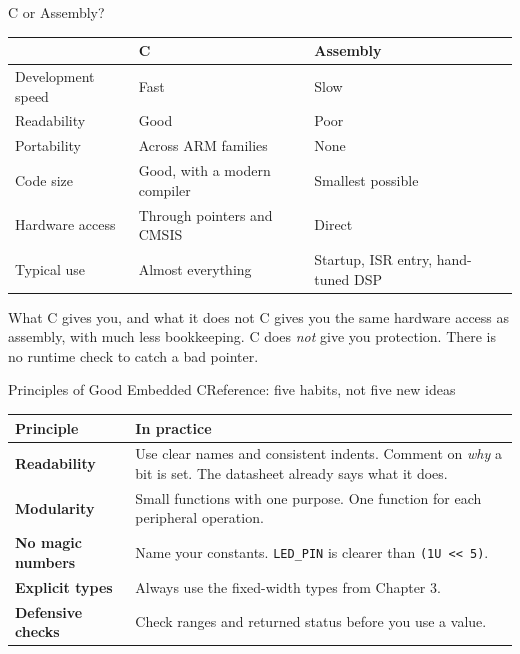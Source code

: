 \documentclass[9pt,aspectratio=169,xcolor=table]{beamer}
\newcommand{\shl}{\texttt{<{}<}}
\begin{document}
\begin{frame}{C or Assembly?}
    \begin{center}
    {\small
    \striped
    \begin{tabular}{@{}l l l@{}}
        \toprule
         & \textbf{C} & \textbf{Assembly} \\
        \midrule
        Development speed & Fast & Slow \\
        Readability & Good & Poor \\
        Portability & Across ARM families & None \\
        Code size & Good, with a modern compiler & Smallest possible \\
        Hardware access & Through pointers and CMSIS & Direct \\
        Typical use & \alert{Almost everything} & Startup, ISR entry, hand-tuned DSP \\
        \bottomrule
    \end{tabular}}
    \end{center}

    \vspace{3mm}
    \begin{block}{What C gives you, and what it does not}
        C gives you the same hardware access as assembly, with much
        less bookkeeping. C does \emph{not} give you \alert{protection}.
        There is no runtime check to catch a bad pointer.
    \end{block}
\end{frame}

\begin{frame}{Principles of Good Embedded C}{Reference: five habits, not five new ideas}
    \begin{center}
    {
    \striped
    \begin{tabular}{@{}l R{.62\textwidth}@{}}
        \toprule
        \textbf{Principle} & \textbf{In practice} \\
        \midrule
        \textbf{Readability} & Use clear names and consistent indents. Comment on \emph{why} a bit is set. The datasheet already says what it does. \\
        \textbf{Modularity} & Small functions with one purpose. One function for each peripheral operation. \\
        \textbf{No magic numbers} & Name your constants. \texttt{LED\_PIN} is clearer than \texttt{(1U \shl\ 5)}. \\
        \textbf{Explicit types} & Always use the fixed-width types from Chapter 3. \\
        \textbf{Defensive checks} & Check ranges and returned status before you use a value. \\
        \bottomrule
    \end{tabular}}
    \end{center}
\end{frame}
\end{document}
